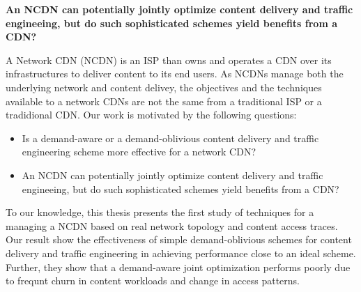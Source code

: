 \textbf{An NCDN can potentially jointly optimize content delivery and traffic engineeing, but do such sophisticated schemes yield benefits from a CDN?}



A Network CDN (NCDN) is an ISP than owns and operates a CDN over its infrastructures to deliver content to its end users. As NCDNs manage both the underlying network and content delivey, the objectives and the techniques available to a network CDNs are not the same from a traditional ISP or a tradidional CDN. Our work is motivated by the following questions:

\begin{itemize}
	\item 
	Is a demand-aware or a demand-oblivious content delivery and traffic engineering scheme more effective for a network CDN?
	\item
	An NCDN can potentially jointly optimize content delivery and traffic engineeing, but do such sophisticated schemes yield benefits from a CDN?
\end{itemize}

To our knowledge, this thesis presents the first study of techniques for a managing a NCDN based on real network topology and content access traces. Our result show the effectiveness of simple demand-oblivious schemes for content delivery and traffic engineering in achieving performance close to an ideal scheme. Further, they show that a demand-aware joint optimization performs poorly due to frequnt churn in content workloads and change in access patterns. 





